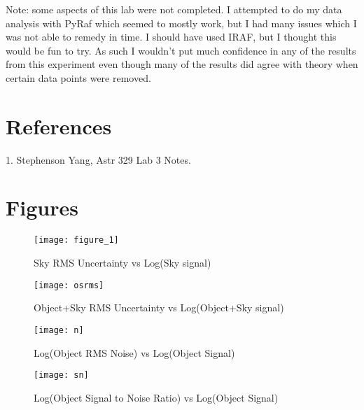 \documentclass{article}
\begin{document}
Note: some aspects of this lab were not completed. I attempted to do my data analysis with PyRaf which seemed to mostly work, but I had many issues which I was not able to remedy in time. I should have used IRAF, but I thought this would be fun to try. As such I wouldn't put much confidence in any of the results from this experiment even though many of the results did agree with theory when certain data points were removed.
\section{References}
1. Stephenson Yang, Astr 329 Lab 3 Notes.
\section{Figures}


\begin{figure}
\texttt{[image: figure\_1]} %
\caption{Sky RMS Uncertainty vs Log(Sky signal)}
\end{figure}
\begin{figure}
\texttt{[image: osrms]} %
\caption{Object+Sky RMS Uncertainty vs Log(Object+Sky signal)}
\end{figure}
\begin{figure}
\texttt{[image: n]} %
\caption{Log(Object RMS Noise) vs Log(Object Signal)}
\end{figure}
\begin{figure}
\texttt{[image: sn]} %
\caption{Log(Object Signal to Noise Ratio) vs Log(Object Signal)}
\end{figure}
\end{document}
